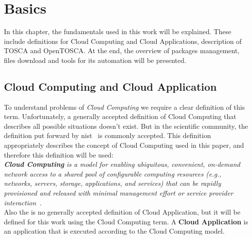 
\chapter{Basics}
\label{chap:basis}
In this chapter, the fundamentals used in this work will be explained.
These include definitions for Cloud Computing and Cloud Applications, description of TOSCA and OpenTOSCA.
At the end, the overview of packages management, files download and tools for its automation will be presented.
\section{Cloud Computing and Cloud Application} \label{sec:cloud}
To understand problems of \emph{Cloud Computing} we require a clear definition of this term.
Unfortunately, a generally accepted definition of Cloud Computing that describes all possible situations doesn't exist. 
But in the scientific community, the definition put forward by \gls{nist}~\cite*{wwwnist} is commonly accepted. 
This definition appropriately describes the concept of Cloud Computing used in this paper, and therefore this definition will be used:\\
\emph{\textbf{Cloud Computing}\label{def:nist} is a model for enabling ubiquitous, convenient, on-demand network access to a shared pool of configurable computing resources (e.g., networks, servers, storage, applications, and services) that can be rapidly provisioned and released with minimal management effort or service provider interaction~\cite*{nist}.}\\
Also the is no generally accepted definition of Cloud Application, but it will be defined for this work using the Cloud Computing term.
A \textbf{Cloud Application}\label{def:capp} is an application that is executed according to the Cloud Computing model. %
